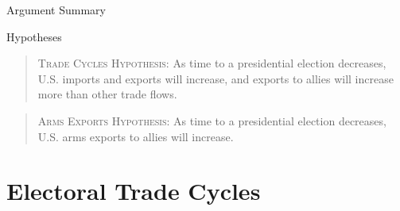 \documentclass[12pt]{beamer}
\begin{document}

\begin{frame}[fragile]{Argument Summary}

\begin{figure}[htpb]
\end{figure}

\end{frame} 



\begin{frame}[fragile]{Hypotheses}

\begin{quote}
\textsc{Trade Cycles Hypothesis}: As time to a presidential election decreases, U.S. imports and exports will increase, and exports to allies will increase more than other trade flows.
\end{quote}
\pause

\vspace{5mm}

\begin{quote}
\textsc{Arms Exports Hypothesis}: As time to a presidential election decreases, U.S. arms exports to allies will increase.
\end{quote}

\end{frame}



\section{Electoral Trade Cycles} 

\end{document}
